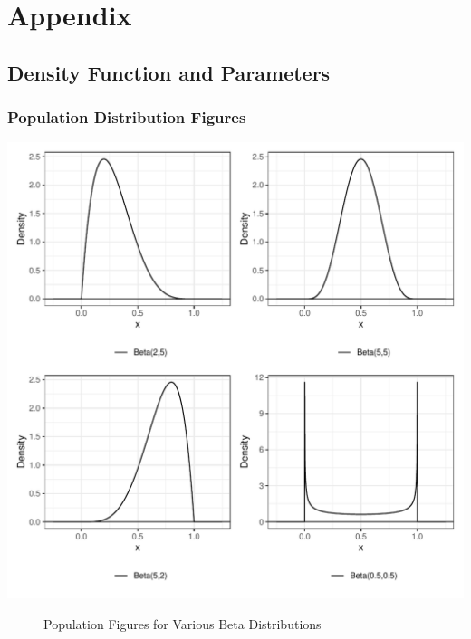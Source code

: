 \documentclass{article}\usepackage[]{graphicx}\usepackage[]{xcolor}
\makeatletter
\def\maxwidth{ %
  \ifdim\Gin@nat@width>\linewidth
    \linewidth
  \else
    \Gin@nat@width
  \fi
}
\newenvironment{knitrout}{}{} %
\makeatother
\begin{document}
\newpage
\onecolumn
\section{Appendix}

\subsection{Density Function and Parameters}
\subsubsection{Population Distribution Figures}
\begin{knitrout}\scriptsize
{}\color{fgcolor}
\includegraphics[width=\maxwidth]{figure/plot1-1} 
\end{knitrout}

\begin{figure}[H]
\begin{center}

\caption{Population Figures for Various Beta Distributions}
\label{populationfigures} %
\end{center}
\end{figure}
\end{document}

